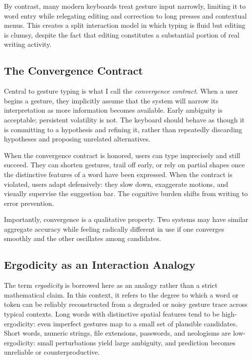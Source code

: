 \documentclass[11pt]{article}
\begin{document}
By contrast, many modern keyboards treat gesture input narrowly, limiting it to word entry while relegating editing and correction to long presses and contextual menus. This creates a split interaction model in which typing is fluid but editing is clumsy, despite the fact that editing constitutes a substantial portion of real writing activity.

\subsection{The Convergence Contract}

Central to gesture typing is what I call the \emph{convergence contract}. When a user begins a gesture, they implicitly assume that the system will narrow its interpretation as more information becomes available. Early ambiguity is acceptable; persistent volatility is not. The keyboard should behave as though it is committing to a hypothesis and refining it, rather than repeatedly discarding hypotheses and proposing unrelated alternatives.

When the convergence contract is honored, users can type imprecisely and still succeed. They can shorten gestures, trail off early, or rely on partial shapes once the distinctive features of a word have been expressed. When the contract is violated, users adapt defensively: they slow down, exaggerate motions, and visually supervise the suggestion bar. The cognitive burden shifts from writing to error prevention.

Importantly, convergence is a qualitative property. Two systems may have similar aggregate accuracy while feeling radically different in use if one converges smoothly and the other oscillates among candidates.

\subsection{Ergodicity as an Interaction Analogy}

The term \emph{ergodicity} is borrowed here as an analogy rather than a strict mathematical claim. In this context, it refers to the degree to which a word or token can be reliably reconstructed from a degraded or noisy gesture trace across typical contexts. Long words with distinctive spatial features tend to be high-ergodicity: even imperfect gestures map to a small set of plausible candidates. Short words, numeric strings, file extensions, passwords, and neologisms are low-ergodicity: small perturbations yield large ambiguity, and prediction becomes unreliable or counterproductive.
\end{document}
